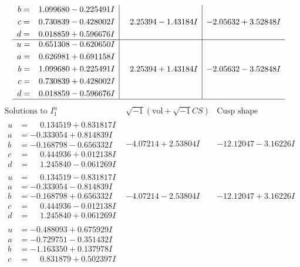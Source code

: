 \documentclass[1p]{elsarticle_modified}
\theoremstyle{definition}
\newcommand{\I}{\sqrt{-1}}
\begin{document}
$$\begin{array}{c|c|c}
\begin{aligned}
b &= \phantom{-}1.099680 - 0.225491 I \\
c &= \phantom{-}0.730839 - 0.428002 I \\
d &= \phantom{-}0.018859 + 0.596676 I\end{aligned}
 & \phantom{-}2.25394 - 1.43184 I & -2.05632 + 3.52848 I \\ \hline\begin{aligned}
u &= \phantom{-}0.651308 - 0.620650 I \\
a &= \phantom{-}0.626981 + 0.691158 I \\
b &= \phantom{-}1.099680 + 0.225491 I \\
c &= \phantom{-}0.730839 + 0.428002 I \\
d &= \phantom{-}0.018859 - 0.596676 I\end{aligned}
 & \phantom{-}2.25394 + 1.43184 I & -2.05632 - 3.52848 I\\
 \hline 
 \end{array}$$\newpage$$\begin{array}{c|c|c}  
\text{Solutions to }I^u_{1}& \I (\text{vol} + \sqrt{-1}CS) & \text{Cusp shape}\\
 \hline 
\begin{aligned}
u &= \phantom{-}0.134519 + 0.831817 I \\
a &= -0.333054 + 0.814839 I \\
b &= -0.168798 - 0.656332 I \\
c &= \phantom{-}0.444936 + 0.012138 I \\
d &= \phantom{-}1.245840 - 0.061269 I\end{aligned}
 & -4.07214 + 2.53804 I & -12.12047 - 3.16226 I \\ \hline\begin{aligned}
u &= \phantom{-}0.134519 - 0.831817 I \\
a &= -0.333054 - 0.814839 I \\
b &= -0.168798 + 0.656332 I \\
c &= \phantom{-}0.444936 - 0.012138 I \\
d &= \phantom{-}1.245840 + 0.061269 I\end{aligned}
 & -4.07214 - 2.53804 I & -12.12047 + 3.16226 I \\ \hline\begin{aligned}
u &= -0.488093 + 0.675929 I \\
a &= -0.729751 - 0.351432 I \\
b &= -1.163350 + 0.137978 I \\
c &= \phantom{-}0.831879 + 0.502397 I \\

\end{aligned}
\end{array}$$
\end{document}
